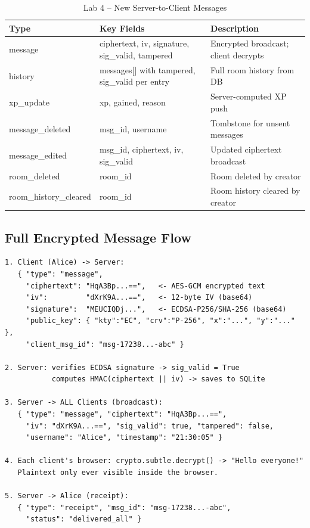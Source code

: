 \documentclass[12pt, a4paper]{article}
\begin{document}
\begin{table}[H]
    \centering
    \small
    \caption{Lab 4 -- New Server-to-Client Messages}
    \begin{tabularx}{\textwidth}{l X X}
        \toprule
        \textbf{Type} & \textbf{Key Fields} & \textbf{Description} \\
        \midrule
        message              & ciphertext, iv, signature, sig\_valid, tampered & Encrypted broadcast; client decrypts \\
        history              & messages[] with tampered, sig\_valid per entry & Full room history from DB \\
        xp\_update           & xp, gained, reason & Server-computed XP push \\
        message\_deleted     & msg\_id, username & Tombstone for unsent messages \\
        message\_edited      & msg\_id, ciphertext, iv, sig\_valid & Updated ciphertext broadcast \\
        room\_deleted        & room\_id & Room deleted by creator \\
        room\_history\_cleared & room\_id & Room history cleared by creator \\
        \bottomrule
    \end{tabularx}
\end{table}

\subsection{Full Encrypted Message Flow}

\begin{lstlisting}[language={}]
1. Client (Alice) -> Server:
   { "type": "message",
     "ciphertext": "HqA3Bp...==",   <- AES-GCM encrypted text
     "iv":         "dXrK9A...==",   <- 12-byte IV (base64)
     "signature":  "MEUCIQDj...",   <- ECDSA-P256/SHA-256 (base64)
     "public_key": { "kty":"EC", "crv":"P-256", "x":"...", "y":"..." },
     "client_msg_id": "msg-17238...-abc" }

2. Server: verifies ECDSA signature -> sig_valid = True
           computes HMAC(ciphertext || iv) -> saves to SQLite

3. Server -> ALL Clients (broadcast):
   { "type": "message", "ciphertext": "HqA3Bp...==",
     "iv": "dXrK9A...==", "sig_valid": true, "tampered": false,
     "username": "Alice", "timestamp": "21:30:05" }

4. Each client's browser: crypto.subtle.decrypt() -> "Hello everyone!"
   Plaintext only ever visible inside the browser.

5. Server -> Alice (receipt):
   { "type": "receipt", "msg_id": "msg-17238...-abc",
     "status": "delivered_all" }
\end{lstlisting}
\end{document}
